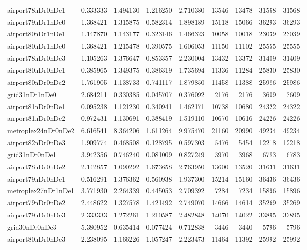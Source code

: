 \begin{longtable}{|l|r|r|r|r|r|r|r|r|}
airport78nDr0nDe1 & 0.333333 & 1.494130 & 1.216250 & 2.710380 & 13546 & 13478 & 31568 & 31568 \\
airport79nDr1nDe0 & 1.368421 & 1.315875 & 0.582314 & 1.898189 & 15118 & 15066 & 36293 & 36293 \\
airport80nDr1nDe1 & 1.147870 & 1.143177 & 0.323146 & 1.466323 & 10058 & 10018 & 23039 & 23039 \\
airport80nDr1nDe0 & 1.368421 & 1.215478 & 0.390575 & 1.606053 & 11150 & 11102 & 25555 & 25555 \\
airport78nDr0nDe3 & 1.105263 & 1.376647 & 0.853357 & 2.230004 & 13432 & 13372 & 31409 & 31409 \\
airport80nDr0nDe1 & 0.385965 & 1.349375 & 0.386319 & 1.735694 & 11336 & 11284 & 25830 & 25830 \\
airport80nDr0nDe2 & 1.761905 & 1.138733 & 0.741117 & 1.879850 & 11458 & 11388 & 25986 & 25986 \\
grid31nDr1nDe0 & 2.684211 & 0.330385 & 0.045707 & 0.376092 & 2176 & 2176 & 3609 & 3609 \\
airport81nDr0nDe1 & 0.095238 & 1.121230 & 0.340941 & 1.462171 & 10738 & 10680 & 24322 & 24322 \\
airport81nDr0nDe2 & 0.972431 & 1.130691 & 0.388419 & 1.519110 & 10670 & 10616 & 24226 & 24226 \\
metroplex24nDr0nDe2 & 6.616541 & 8.364206 & 1.611264 & 9.975470 & 21160 & 20990 & 49234 & 49234 \\
airport82nDr0nDe3 & 1.909774 & 0.468508 & 0.128795 & 0.597303 & 5476 & 5454 & 12218 & 12218 \\
grid31nDr0nDe1 & 3.942356 & 0.746240 & 0.081009 & 0.827249 & 3970 & 3968 & 6783 & 6783 \\
airport78nDr0nDe2 & 2.142857 & 1.090292 & 1.673658 & 2.763950 & 13600 & 13520 & 31631 & 31631 \\
airport79nDr0nDe1 & 0.516291 & 1.376362 & 0.560938 & 1.937300 & 15214 & 15160 & 36436 & 36436 \\
metroplex27nDr1nDe1 & 3.771930 & 2.264339 & 0.445053 & 2.709392 & 7284 & 7234 & 15896 & 15896 \\
airport79nDr0nDe2 & 2.448622 & 1.327578 & 1.421492 & 2.749070 & 14666 & 14614 & 35269 & 35269 \\
airport79nDr0nDe3 & 2.333333 & 1.272261 & 1.210587 & 2.482848 & 14070 & 14022 & 33895 & 33895 \\
grid30nDr0nDe3 & 5.380952 & 0.635414 & 0.077424 & 0.712838 & 3446 & 3440 & 5796 & 5796 \\
airport80nDr0nDe3 & 2.238095 & 1.166226 & 1.057247 & 2.223473 & 11464 & 11392 & 25992 & 25992 \\

\end{longtable}
